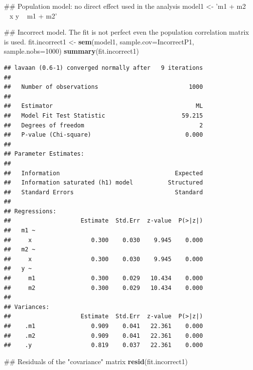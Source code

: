 \documentclass[]{article}
\newenvironment{Shaded}{\begin{snugshade}}{\end{snugshade}}
\newcommand{\KeywordTok}[1]{\textcolor[rgb]{0.13,0.29,0.53}{\textbf{#1}}}
\newcommand{\DataTypeTok}[1]{\textcolor[rgb]{0.13,0.29,0.53}{#1}}
\newcommand{\DecValTok}[1]{\textcolor[rgb]{0.00,0.00,0.81}{#1}}
\newcommand{\StringTok}[1]{\textcolor[rgb]{0.31,0.60,0.02}{#1}}
\newcommand{\NormalTok}[1]{#1}
\begin{document}
\begin{Shaded}
\begin{Highlighting}[]
\NormalTok{## Population model: no direct effect used in the analysis}
\NormalTok{model1 <-}\StringTok{ 'm1 + m2 ~ x}
\StringTok{           y ~ m1 + m2'}

\NormalTok{## Incorrect model. The fit is not perfect even the population correlation matrix is used.}
\NormalTok{fit.incorrect1 <-}\StringTok{ }\KeywordTok{sem}\NormalTok{(model1, }\DataTypeTok{sample.cov=}\NormalTok{IncorrectP1, }\DataTypeTok{sample.nobs=}\DecValTok{1000}\NormalTok{)}
\KeywordTok{summary}\NormalTok{(fit.incorrect1)}
\end{Highlighting}
\end{Shaded}

\begin{verbatim}
## lavaan (0.6-1) converged normally after   9 iterations
## 
##   Number of observations                          1000
## 
##   Estimator                                         ML
##   Model Fit Test Statistic                      59.215
##   Degrees of freedom                                 2
##   P-value (Chi-square)                           0.000
## 
## Parameter Estimates:
## 
##   Information                                 Expected
##   Information saturated (h1) model          Structured
##   Standard Errors                             Standard
## 
## Regressions:
##                    Estimate  Std.Err  z-value  P(>|z|)
##   m1 ~                                                
##     x                 0.300    0.030    9.945    0.000
##   m2 ~                                                
##     x                 0.300    0.030    9.945    0.000
##   y ~                                                 
##     m1                0.300    0.029   10.434    0.000
##     m2                0.300    0.029   10.434    0.000
## 
## Variances:
##                    Estimate  Std.Err  z-value  P(>|z|)
##    .m1                0.909    0.041   22.361    0.000
##    .m2                0.909    0.041   22.361    0.000
##    .y                 0.819    0.037   22.361    0.000
\end{verbatim}

\begin{Shaded}
\begin{Highlighting}[]
\NormalTok{## Residuals of the "covariance" matrix}
\KeywordTok{resid}\NormalTok{(fit.incorrect1)}
\end{Highlighting}
\end{Shaded}
\end{document}
